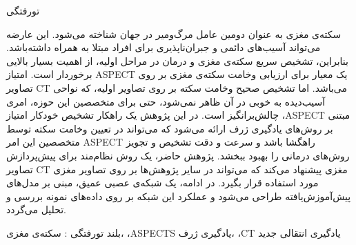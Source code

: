 


‌تورفتگی

سکته‌ی مغزی به عنوان دومین عامل مرگ‌و‌میر در جهان شناخته می‌شود.
این عارضه می‌تواند آسیب‌های دائمی و جبران‌ناپذیری برای افراد مبتلا به همراه داشته‌باشد.
بنابراین،
تشخیص سریع سکته‌ی مغزی و درمان در مراحل اولیه، از اهمیت بسیار بالایی برخوردار است.
امتیاز ASPECT یک معیار برای ارزیابی وخامت سکته‌ی مغزی بر روی تصاویر CT می‌باشد.
اما تشخیص صحیح وخامت سکته بر روی تصاویر اولیه، که نواحی آسیب‌دیده به خوبی در آن ظاهر نمی‌شود، حتی برای متخصصین این حوزه، امری چالش‌بر‌انگیز است.
 در این پژوهش 
یک راهکار تشخیص خودکار امتیاز ،ASPECT مبتنی بر روش‌های یادگیری ژرف ارائه می‌شود که می‌تواند
 در تعیین وخامت سکته توسط متخصصین این امر ASPECT راهگشا باشد و سرعت و دقت تشخیص و تجویز روش‌های درمانی را بهبود ببخشد.
پژوهش حاضر، یک روش نظام‌مند برای پیش‌پردازش تصاویر CT مغزی پیشنهاد می‌کند که می‌تواند در سایر پژوهش‌ها بر روی تصاویر مغزی مورد استفاده قرار بگیرد.
در ادامه، یک شبکه‌ی عصبی عمیق، مبنی بر مدل‌های پیش‌آموزش‌یافته طراحی می‌شود و  عملکرد این شبکه بر روی داده‌های نمونه بررسی و تحلیل می‌گردد.
 

‌بلند
‌تورفتگی : 
سکته‌ی مغزی، ،ASPECTS یادگیری ژرف، ،CT یادگیری انتقالی
‌جدید
